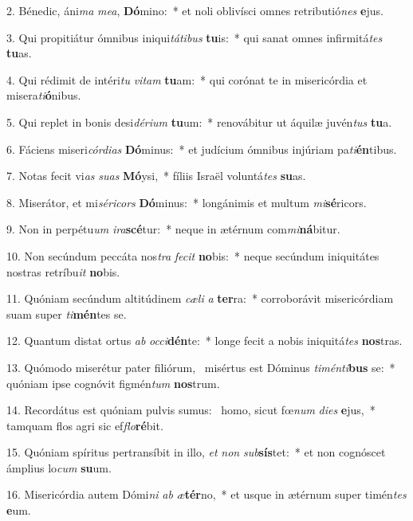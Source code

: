 2. Bénedic, áni\textit{ma} \textit{me}\textit{a}, \textbf{Dó}mino:~*  et noli oblivísci omnes retributió\textit{nes} \textbf{e}jus.\

3. Qui propitiátur ómnibus iniqui\textit{tá}\textit{ti}\textit{bus} \textbf{tu}is:~*  qui sanat omnes infirmitá\textit{tes} \textbf{tu}as.\

4. Qui rédimit de intéri\textit{tu} \textit{vi}\textit{tam} \textbf{tu}am:~*  qui corónat te in misericórdia et misera\textit{ti}\textbf{ó}nibus.\

5. Qui replet in bonis desi\textit{dé}\textit{ri}\textit{um} \textbf{tu}um:~*  renovábitur ut áquilæ juvén\textit{tus} \textbf{tu}a.\

6. Fáciens miseri\textit{cór}\textit{di}\textit{as} \textbf{Dó}minus:~*  et judícium ómnibus injúriam pa\textit{ti}\textbf{én}tibus.\

7. Notas fecit vi\textit{as} \textit{su}\textit{as} \textbf{Mó}ysi,~*  fíliis Israël voluntá\textit{tes} \textbf{su}as.\

8. Miserátor, et mi\textit{sé}\textit{ri}\textit{cors} \textbf{Dó}minus:~*  longánimis et multum \textit{mi}\textbf{sé}ricors.\

9. Non in perpétu\textit{um} \textit{i}\textit{ra}\textbf{scé}tur:~*  neque in ætérnum com\textit{mi}\textbf{ná}bitur.\

10. Non secúndum peccáta nos\textit{tra} \textit{fe}\textit{cit} \textbf{no}bis:~*  neque secúndum iniquitátes nostras retríbu\textit{it} \textbf{no}bis.\

11. Quóniam secúndum altitúdinem \textit{cæ}\textit{li} \textit{a} \textbf{ter}ra:~*  corroborávit misericórdiam suam super \textit{ti}\textbf{mén}tes se.\

12. Quantum distat ortus \textit{ab} \textit{oc}\textit{ci}\textbf{dén}te:~*  longe fecit a nobis iniquitá\textit{tes} \textbf{nos}tras.\

13. Quómodo miserétur pater filiórum, \dag\  misértus est Dóminus \textit{ti}\textit{mén}\textit{ti}\textbf{bus} se:~*  quóniam ipse cognóvit figmén\textit{tum} \textbf{nos}trum.\

14. Recordátus est quóniam pulvis sumus: \dag\  homo, sicut fœ\textit{num} \textit{di}\textit{es} \textbf{e}jus,~*  tamquam flos agri sic ef\textit{flo}\textbf{ré}bit.\

15. Quóniam spíritus pertransíbit in illo, \textit{et} \textit{non} \textit{sub}\textbf{sís}tet:~*  et non cognóscet ámplius lo\textit{cum} \textbf{su}um.\

16. Misericórdia autem Dómi\textit{ni} \textit{ab} \textit{æ}\textbf{tér}no,~*  et usque in ætérnum super timén\textit{tes} \textbf{e}um.\

